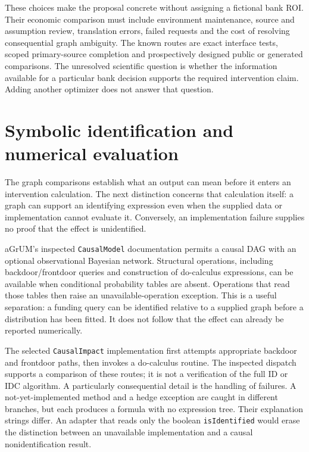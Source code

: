 These choices make the proposal concrete without assigning a fictional bank
ROI. Their economic comparison must include environment maintenance, source
and assumption review, translation errors, failed requests and the cost of
resolving consequential graph ambiguity. The known routes are exact interface
tests, scoped primary-source completion and prospectively designed public or
generated comparisons. The unresolved scientific question is whether the
information available for a particular bank decision supports the required
intervention claim. Adding another optimizer does not answer that question.
\label{exec13:python-discovery-end}




\section{Symbolic identification and numerical evaluation}

The graph comparisons establish what an output can mean before it enters an
intervention calculation. The next distinction concerns that calculation
itself: a graph can support an identifying expression even when the supplied
data or implementation cannot evaluate it. Conversely, an implementation
failure supplies no proof that the effect is unidentified.

aGrUM's inspected \texttt{CausalModel} documentation permits a causal DAG with
an optional observational Bayesian network. Structural operations, including
backdoor/frontdoor queries and construction of do-calculus expressions, can
be available when conditional probability tables are absent. Operations that
read those tables then raise an unavailable-operation exception. This is a
useful separation: a funding query can be identified relative to a supplied
graph before a distribution has been fitted. It does not follow that the
effect can already be reported numerically. \citep{v12_sw_agrum}

The selected \texttt{CausalImpact} implementation first attempts appropriate
backdoor and frontdoor paths, then invokes a do-calculus routine. The inspected
dispatch supports a comparison of these routes; it is not a verification of
the full ID or IDC algorithm. A particularly consequential detail is the
handling of failures. A not-yet-implemented method and a hedge exception are
caught in different branches, but each produces a formula with no expression
tree. Their explanation strings differ. An adapter that reads only the boolean
\texttt{isIdentified} would erase the distinction between an unavailable
implementation and a causal nonidentification result. \citep{v12_sw_agrum}

